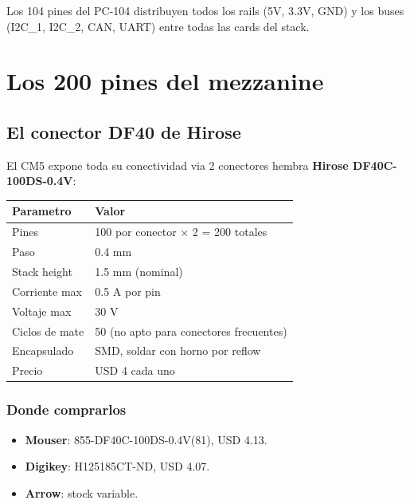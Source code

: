 \documentclass[11pt,a4paper,oneside,openright]{book}
\begin{document}
Los 104 pines del PC-104 distribuyen todos los rails (5V, 3.3V, GND) y
los buses (I2C\_1, I2C\_2, CAN, UART) entre todas las cards del stack.

\chapter{Los 200 pines del mezzanine}
\label{ch:mezzanine}

\section{El conector DF40 de Hirose}

El CM5 expone toda su conectividad via 2 conectores hembra
\textbf{Hirose DF40C-100DS-0.4V}:

\begin{center}
\begin{tabular}{ll}
\toprule
\textbf{Parametro} & \textbf{Valor} \\
\midrule
Pines              & 100 por conector $\times$ 2 = 200 totales \\
Paso               & 0.4 mm \\
Stack height       & 1.5 mm (nominal) \\
Corriente max      & 0.5 A por pin \\
Voltaje max        & 30 V \\
Ciclos de mate     & 50 (no apto para conectores frecuentes) \\
Encapsulado        & SMD, soldar con horno por reflow \\
Precio             & USD 4 cada uno \\
\bottomrule
\end{tabular}
\end{center}

\subsection{Donde comprarlos}

\begin{itemize}[leftmargin=2em]
  \item \textbf{Mouser}: 855-DF40C-100DS-0.4V(81), USD 4.13.
  \item \textbf{Digikey}: H125185CT-ND, USD 4.07.
  \item \textbf{Arrow}: stock variable.
\end{itemize}
\end{document}
